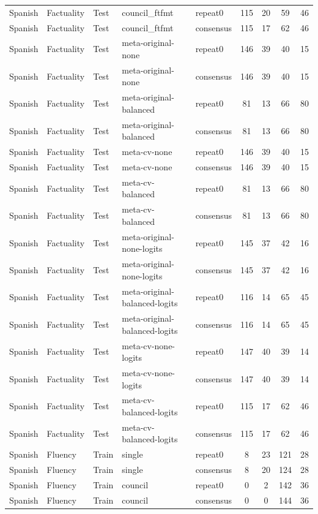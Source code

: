 \begin{tabular}{lllllcccc}
Spanish & Factuality & Test & council\_ftfmt & repeat0 & 115 & 20 & 59 & 46 \\
Spanish & Factuality & Test & council\_ftfmt & consensus & 115 & 17 & 62 & 46 \\
Spanish & Factuality & Test & meta-original-none & repeat0 & 146 & 39 & 40 & 15 \\
Spanish & Factuality & Test & meta-original-none & consensus & 146 & 39 & 40 & 15 \\
Spanish & Factuality & Test & meta-original-balanced & repeat0 & 81 & 13 & 66 & 80 \\
Spanish & Factuality & Test & meta-original-balanced & consensus & 81 & 13 & 66 & 80 \\
Spanish & Factuality & Test & meta-cv-none & repeat0 & 146 & 39 & 40 & 15 \\
Spanish & Factuality & Test & meta-cv-none & consensus & 146 & 39 & 40 & 15 \\
Spanish & Factuality & Test & meta-cv-balanced & repeat0 & 81 & 13 & 66 & 80 \\
Spanish & Factuality & Test & meta-cv-balanced & consensus & 81 & 13 & 66 & 80 \\
Spanish & Factuality & Test & meta-original-none-logits & repeat0 & 145 & 37 & 42 & 16 \\
Spanish & Factuality & Test & meta-original-none-logits & consensus & 145 & 37 & 42 & 16 \\
Spanish & Factuality & Test & meta-original-balanced-logits & repeat0 & 116 & 14 & 65 & 45 \\
Spanish & Factuality & Test & meta-original-balanced-logits & consensus & 116 & 14 & 65 & 45 \\
Spanish & Factuality & Test & meta-cv-none-logits & repeat0 & 147 & 40 & 39 & 14 \\
Spanish & Factuality & Test & meta-cv-none-logits & consensus & 147 & 40 & 39 & 14 \\
Spanish & Factuality & Test & meta-cv-balanced-logits & repeat0 & 115 & 17 & 62 & 46 \\
Spanish & Factuality & Test & meta-cv-balanced-logits & consensus & 115 & 17 & 62 & 46 \\
Spanish & Fluency & Train & single & repeat0 & 8 & 23 & 121 & 28 \\
Spanish & Fluency & Train & single & consensus & 8 & 20 & 124 & 28 \\
Spanish & Fluency & Train & council & repeat0 & 0 & 2 & 142 & 36 \\
Spanish & Fluency & Train & council & consensus & 0 & 0 & 144 & 36 \\

\end{tabular}
